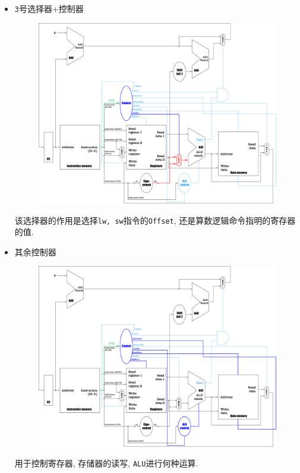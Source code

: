 \begin{itemize}
\item \verb|3|号选择器+控制器
\begin{figure}[H]
\centering
\includegraphics[scale=.2]{img/figure34.pdf}
\end{figure}
该选择器的作用是选择\verb|lw, sw|指令的\verb|Offset|, 还是算数逻辑命令指明的寄存器的值.
\item 其余控制器
\begin{figure}[H]
\centering
\includegraphics[scale=.2]{img/figure35.pdf}
\end{figure}
用于控制寄存器, 存储器的读写, \verb|ALU|进行何种运算.
\end{itemize}
